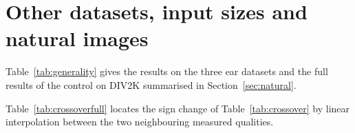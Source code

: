 \appendix
{}
\renewcommand{\thetable}{\Alph{section}.\arabic{table}}

\section{Other datasets, input sizes and natural images}
\label{app:generality}
Table~\ref{tab:generality} gives the results on the three ear datasets and the full results of the control on DIV2K summarised in Section~\ref{sec:natural}.

\begin{table}[H]
\centering
\caption{Median PSNR gain over bicubic interpolation of the \NPub{} published fidelity-oriented models (dB), by dataset, input size and input degradation; ear images above, natural images (DIV2K) below. In parentheses: number of models whose mean gain is negative / number whose 95\% confidence interval lies entirely below zero. ``--'': not evaluated.}
\label{tab:generality}
\end{table}

Table~\ref{tab:crossoverfull} locates the sign change of Table~\ref{tab:crossover} by linear interpolation between the two neighbouring measured qualities.

\begin{table}[H]
\centering
\caption{Sign change of the median gain of the \NPub{} published models over bicubic interpolation, located by linear interpolation between the two neighbouring measured qualities (the error ratio on a log scale), with 95\% bootstrap intervals. The intervals reflect only the resampling of subjects (of images for DIV2K), not the spacing of the levels, so the interpolated values describe the data and are not measurements.}
\label{tab:crossoverfull}
\small
{}
\end{table}

